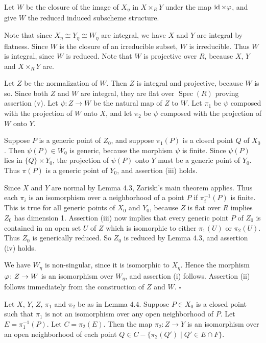 \documentclass[12pt]{memoir}
\providecommand{\Spec}{\operatorname{Spec}}
\begin{document}
\begin{ptcbp}
Let $W$ be the closure of the image of $X_\eta$ in $X \times_R Y$ under the map $\operatorname{id} \times \varphi$, and give $W$ the reduced induced subscheme structure.

Note that since $X_\eta \cong Y_\eta \cong W_\eta$ are integral, we have $X$ and $Y$ are integral by flatness. Since $W$ is the closure of an irreducible subset, $W$ is irreducible. Thus $W$ is integral, since $W$ is reduced. Note that $W$ is projective over $R$, because $X$, $Y$ and $X \times_R Y$ are.

Let $Z$ be the normalization of $W$. Then $Z$ is integral and projective, because $W$ is so. Since both $Z$ and $W$ are integral, they are flat over $\Spec(R)$ proving assertion (v). Let $\psi\colon Z \to W$ be the natural map of $Z$ to $W$. Let $\pi_1$ be $\psi$ composed with the projection of $W$ onto $X$, and let $\pi_2$ be $\psi$ composed with the projection of $W$ onto $Y$.

Suppose $P$ is a generic point of $Z_0$, and suppose $\pi_1(P)$ is a closed point $Q$ of $X_0$. Then $\psi(P) \in W_0$ is generic, because the morphism $\psi$ is finite. Since $\psi(P)$ lies in $\{Q\} \times Y_0$, the projection of $\psi(P)$ onto $Y$ must be a generic point of $Y_0$. Thus $\pi(P)$ is a generic point of $Y_0$, and assertion (iii) holds.

Since $X$ and $Y$ are normal by Lemma 4.3, Zariski's main theorem applies. Thus each $\pi_i$ is an isomorphism over a neighborhood of a point $P$ if $\pi_i^{-1}(P)$ is finite. This is true for all generic points of $X_0$ and $Y_0$, because $Z$ is flat over $R$ implies $Z_0$ has dimension 1. Assertion (iii) now implies that every generic point $P$ of $Z_0$ is contained in an open set $U$ of $Z$ which is isomorphic to either $\pi_1(U)$ or $\pi_2(U)$. Thus $Z_0$ is generically reduced. So $Z_0$ is reduced by Lemma 4.3, and assertion (iv) holds.

We have $W_\eta$ is non-singular, since it is isomorphic to $X_\eta$. Hence the morphism $\varphi\colon Z \to W$ is an isomorphism over $W_\eta$, and assertion (i) follows. Assertion (ii) follows immediately from the construction of $Z$ and $W$. \hfill$\square$
\end{ptcbp}

\begin{Lem}\label{lem:4.5}
Let $X$, $Y$, $Z$, $\pi_1$ and $\pi_2$ be as in Lemma 4.4. Suppose $P \in X_0$ is a closed point such that $\pi_1$ is not an isomorphism over any open neighborhood of $P$. Let $E = \pi_1^{-1}(P)$. Let $C = \pi_2(E)$. Then the map $\pi_2\colon Z \to Y$ is an isomorphism over an open neighborhood of each point $Q \in C - \{\pi_2(Q') \mid Q' \in E \cap F\}$.
\end{Lem}
\end{document}
